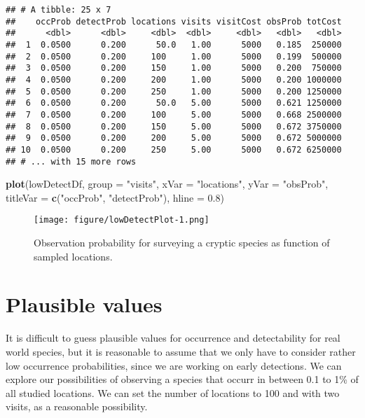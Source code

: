 \documentclass[]{article}
\newenvironment{Shaded}{\begin{snugshade}}{\end{snugshade}}
\newcommand{\KeywordTok}[1]{\textcolor[rgb]{0.13,0.29,0.53}{\textbf{#1}}}
\newcommand{\DataTypeTok}[1]{\textcolor[rgb]{0.13,0.29,0.53}{#1}}
\newcommand{\FloatTok}[1]{\textcolor[rgb]{0.00,0.00,0.81}{#1}}
\newcommand{\StringTok}[1]{\textcolor[rgb]{0.31,0.60,0.02}{#1}}
\newcommand{\NormalTok}[1]{#1}
\begin{document}
\begin{verbatim}
## # A tibble: 25 x 7
##    occProb detectProb locations visits visitCost obsProb totCost
##      <dbl>      <dbl>     <dbl>  <dbl>     <dbl>   <dbl>   <dbl>
##  1  0.0500      0.200      50.0   1.00      5000   0.185  250000
##  2  0.0500      0.200     100     1.00      5000   0.199  500000
##  3  0.0500      0.200     150     1.00      5000   0.200  750000
##  4  0.0500      0.200     200     1.00      5000   0.200 1000000
##  5  0.0500      0.200     250     1.00      5000   0.200 1250000
##  6  0.0500      0.200      50.0   5.00      5000   0.621 1250000
##  7  0.0500      0.200     100     5.00      5000   0.668 2500000
##  8  0.0500      0.200     150     5.00      5000   0.672 3750000
##  9  0.0500      0.200     200     5.00      5000   0.672 5000000
## 10  0.0500      0.200     250     5.00      5000   0.672 6250000
## # ... with 15 more rows
\end{verbatim}

\begin{Shaded}
\begin{Highlighting}[]
\KeywordTok{plot}\NormalTok{(lowDetectDf, }\DataTypeTok{group =} \StringTok{"visits"}\NormalTok{, }\DataTypeTok{xVar =} \StringTok{"locations"}\NormalTok{, }\DataTypeTok{yVar =} \StringTok{"obsProb"}\NormalTok{, }\DataTypeTok{titleVar =} \KeywordTok{c}\NormalTok{(}\StringTok{"occProb"}\NormalTok{, }
    \StringTok{"detectProb"}\NormalTok{), }\DataTypeTok{hline =} \FloatTok{0.8}\NormalTok{)}
\end{Highlighting}
\end{Shaded}

\begin{figure}
\centering
\texttt{[image: figure/lowDetectPlot-1.png]}
\caption{Observation probability for surveying a cryptic species as
function of sampled locations. \label{lowDetectPlot}}
\end{figure}

\section{Plausible values}\label{plausible-values}

It is difficult to guess plausible values for occurrence and
detectability for real world species, but it is reasonable to assume
that we only have to consider rather low occurrence probabilities, since
we are working on early detections. We can explore our possibilities of
observing a species that occurr in between 0.1 to 1\% of all studied
locations. We can set the number of locations to 100 and with two
visits, as a reasonable possibility.
\end{document}

